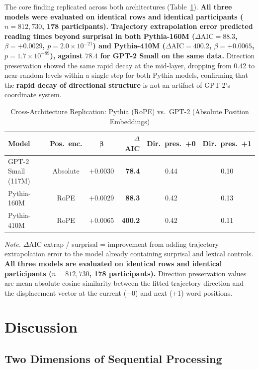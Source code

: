 \documentclass[12pt]{article}
\newcommand{\new}[1]{{\bfseries #1}}
\begin{document}
The core finding replicated across both architectures (Table~\ref{tab:crossarch}). \new{All three models were evaluated on identical rows and identical participants ($n = 812{,}730$, 178 participants). Trajectory extrapolation error predicted reading times beyond surprisal in both Pythia-160M ($\Delta\text{AIC} = 88.3$, $\beta = +0.0029$, $p = 2.0 \times 10^{-21}$) and Pythia-410M ($\Delta\text{AIC} = 400.2$, $\beta = +0.0065$, $p = 1.7 \times 10^{-89}$), against $78.4$ for GPT-2 Small on the same data.} Direction preservation showed the same rapid decay at the mid-layer, dropping from 0.42 to near-random levels within a single step for both Pythia models, confirming that the \new{rapid decay of directional structure} is not an artifact of GPT-2's coordinate system.

\begin{table}[!htbp]
\centering
\caption{Cross-Architecture Replication: Pythia (RoPE) vs.\ GPT-2 (Absolute Position Embeddings)}
\label{tab:crossarch}
\begin{tabular}{lccrcc}
\toprule
\textbf{Model} & \textbf{Pos.\ enc.} & \new{$\boldsymbol{\beta}$} & \textbf{$\Delta$AIC} & \textbf{Dir.\ pres.\ +0} & \textbf{Dir.\ pres.\ +1} \\
\midrule
GPT-2 Small (117M) & Absolute & \new{$+0.0030$} & \new{78.4} & 0.44 & 0.10 \\
Pythia-160M & RoPE & \new{$+0.0029$} & \new{88.3} & 0.42 & 0.13 \\
Pythia-410M & RoPE & \new{$+0.0065$} & \new{400.2} & 0.42 & 0.11 \\
\bottomrule
\end{tabular}

\smallskip
\footnotesize
\textit{Note.} $\Delta$AIC extrap / surprisal = improvement from adding trajectory extrapolation error to the model already containing surprisal and lexical controls. \new{All three models are evaluated on identical rows and identical participants ($n = 812{,}730$, 178 participants).} Direction preservation values are mean absolute cosine similarity between the fitted trajectory direction and the displacement vector at the current (+0) and next (+1) word positions.
\end{table}

\FloatBarrier

\section{Discussion}

\subsection{Two Dimensions of Sequential Processing}
\end{document}
